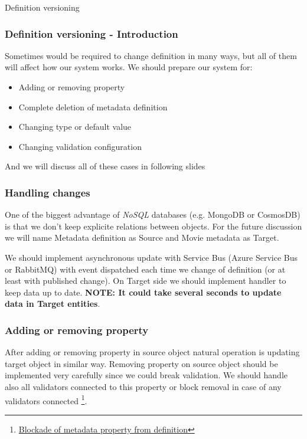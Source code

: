 \documentclass{beamer}
\begin{document}
\begin{section}{Definition versioning}

\begin{frame}
\frametitle{Definition versioning - Introduction}
Sometimes would be required to change definition in many ways, but all of them will affect how our system works. We should prepare our system for: 
\pause
\begin{itemize}
	\item Adding or removing property \pause
	\item Complete deletion of metadata definition \pause
	\item Changing type or default value \pause
	\item Changing validation configuration \pause
\end{itemize}
And we will discuss all of these cases in following slides
\end{frame}

\begin{frame}
\frametitle{Handling changes}
One of the biggest advantage of \textit{NoSQL} databases (e.g. MongoDB or CosmosDB) is that we don't keep explicite relations between objects. For the future discussion we will name Metadata definition as Source and Movie metadata as Target. \newline \newline \pause

We should implement asynchronous update with Service Bus (Azure Service Bus or RabbitMQ) with event dispatched each time we change of definition (or at least with published change). On Target side we should implement handler to keep data up to date. \pause  \newline\textbf{NOTE: It could take several seconds to update data in Target entities}.

\end{frame}

\begin{frame}
\frametitle{Adding or removing property}
After adding or removing property in source object natural operation is updating target object in similar way.
\newline
\newline
Removing property on source object should be implemented very carefully since we could break validation. We should handle also all validators connected to this property or block removal in case of any validators connected \footnote[1]{\href{https://github.com/paqaos/DynamicMetadata-SFI2021/blob/main/MovieDatabase/MovieDatabase/CommandStack/CommandHandlers/MetadataDefinitions/RemoveMovieMetadataCommandHandler.cs}{Blockade of metadata property from definition}}.
\end{frame}


\end{section}
\end{document}

